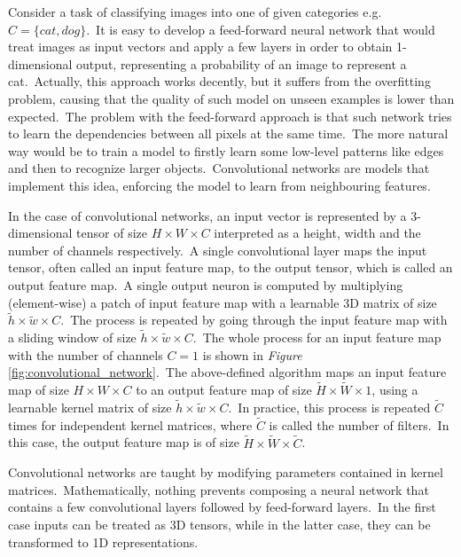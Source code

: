 \documentclass[longabstract, english, mgr]{iithesis}
\theoremstyle{default_theorem_style}\newtheorem{theorem}{Theorem}
\theoremstyle{default_theorem_style}\newtheorem{definition}{Definition}
\begin{document}
Consider a task of classifying images into one of given categories e.g.\ $C = \{cat, dog\}$.\ It is easy to develop
a feed-forward neural network that would treat images as input vectors and apply a few layers in order to obtain
1-dimensional output, representing a probability of an image to represent a cat.\ Actually, this approach works
decently, but it suffers from the overfitting problem, causing that the quality of such model on unseen examples is
lower than expected.\ The problem with the feed-forward approach is that such network tries to learn the dependencies
between all pixels at the same time.\ The more natural way would be to train a model to firstly learn some
low-level patterns like edges and then to recognize larger objects.\ Convolutional networks are models that implement
this idea, enforcing the model to learn from neighbouring features.\newline

\noindent In the case of convolutional networks, an input vector is represented by a 3-dimensional tensor of size
$H \times W \times C$ interpreted as a height, width and  the number of channels respectively.\ A single convolutional
layer maps the input tensor, often called an input feature map, to the output tensor, which is called an output
feature map.\ A single output neuron is computed by multiplying (element-wise) a patch of input feature map with
a learnable 3D matrix of size $\tilde{h} \times \tilde{w} \times C$.\ The process is repeated by going through the
input feature map with a sliding window of size $\tilde{h} \times \tilde{w} \times C$.\ The whole process for an input
feature map with the number of channels $C = 1$ is shown in \textit{Figure}
\ref{fig:convolutional_network}.\ The above-defined algorithm maps an input feature map of size
$H \times W \times C$ to an output feature map of size $\tilde{H} \times \tilde{W} \times 1$, using a learnable
kernel matrix of size $\tilde{h} \times \tilde{w} \times C$.\ In practice, this process is repeated $\tilde{C}$ times
for independent kernel matrices, where $\tilde{C}$ is called the number of filters.\ In this case, the output feature
map is of size $\tilde{H} \times \tilde{W} \times \tilde{C}$.\newline

\noindent Convolutional networks are taught by modifying parameters contained in kernel matrices.\ Mathematically,
nothing prevents composing a neural network that contains a few convolutional layers followed by feed-forward
layers.\ In the first case inputs can be treated as 3D tensors, while in the latter case, they can be transformed
to 1D representations.
\end{document}
